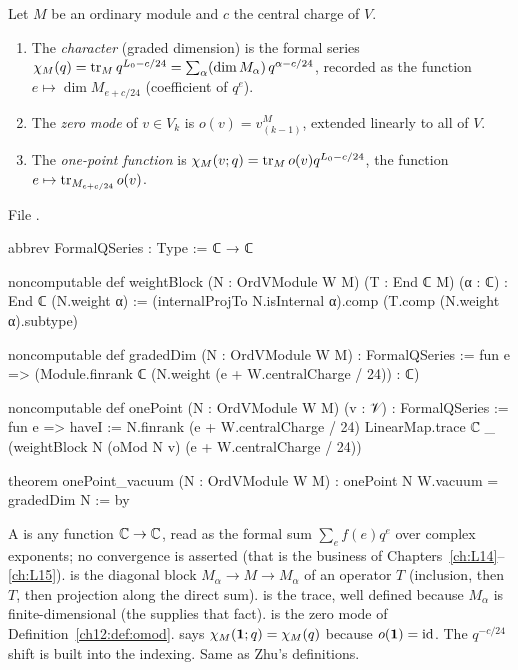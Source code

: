 \begin{definition}\label{l12:def:char}
Let $M$ be an ordinary module and $c$ the central charge of $V$.
\begin{enumerate}
\item The \emph{character} (graded dimension) is the formal series
  $\chi_M(q) = \operatorname{tr}_M q^{L_0-c/24} = \sum_\alpha(\dim M_\alpha)\,q^{\alpha-c/24}$, recorded as the function
  $e\mapsto\dim M_{e+c/24}$ (coefficient of $q^e$).
\item The \emph{zero mode} of $v\in V_k$ is $o(v) = v^M_{(k-1)}$, extended linearly to all of $V$.
\item The \emph{one-point function} is $\chi_M(v;q) = \operatorname{tr}_M o(v)q^{L_0-c/24}$, the function
  $e\mapsto\operatorname{tr}_{M_{e+c/24}}o(v)$.
\end{enumerate}
\end{definition}
\noindent File .
\begin{leancode}
abbrev FormalQSeries : Type := ℂ → ℂ

noncomputable def weightBlock (N : OrdVModule W M) (T : End ℂ M) (α : ℂ) : End ℂ (N.weight α) :=
  (internalProjTo N.isInternal α).comp (T.comp (N.weight α).subtype)

noncomputable def gradedDim (N : OrdVModule W M) : FormalQSeries :=
  fun e => (Module.finrank ℂ (N.weight (e + W.centralCharge / 24)) : ℂ)

noncomputable def onePoint (N : OrdVModule W M) (v : 𝒱) : FormalQSeries :=
  fun e =>
    haveI := N.finrank (e + W.centralCharge / 24)
    LinearMap.trace ℂ _ (weightBlock N (oMod N v) (e + W.centralCharge / 24))

theorem onePoint_vacuum (N : OrdVModule W M) : onePoint N W.vacuum = gradedDim N := by
\end{leancode}

\begin{dictionary}
A  is any function ${\mathbb{C}}\to{\mathbb{C}}$, read as the formal sum $\sum_e f(e)q^e$ over complex
exponents; no convergence is asserted (that is the business of Chapters~\ref{ch:L14}--\ref{ch:L15}).
 is the diagonal block $M_\alpha\to M\to M_\alpha$ of an operator $T$ (inclusion,
then $T$, then projection along the direct sum).  is the trace, well defined because
$M_\alpha$ is finite-dimensional (the  supplies that fact).  is the zero mode of
Definition~\ref{ch12:def:omod}.  says $\chi_M(\mathbf{1};q) = \chi_M(q)$
because $o(\mathbf{1}) = \mathrm{id}$. The $q^{-c/24}$ shift is built into the indexing. Same as Zhu's
definitions.
\end{dictionary}

